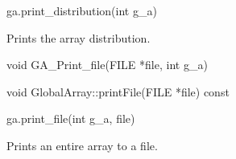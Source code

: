 \documentclass[12pt]{article}
\begin{document}
\begin{pyapi}
\begin{pycode}
ga.print_distribution(int g_a)
\end{pycode}
\begin{funcargs}
\end{funcargs}
\end{pyapi}

\gcoll

\begin{desc}

Prints the array distribution.

\end{desc}


\begin{capi}
\begin{ccode}
void GA_Print_file(FILE *file, int g_a)
\end{ccode}
\begin{funcargs}
\end{funcargs}
\end{capi}

\begin{cxxapi}
\begin{cxxcode}
void GlobalArray::printFile(FILE *file) const
\end{cxxcode}
\begin{funcargs}
\end{funcargs}
\end{cxxapi}

\begin{pyapi}
\begin{pycode}
ga.print_file(int g_a, file)
\end{pycode}
\begin{funcargs}
\end{funcargs}
\end{pyapi}

\gcoll

\begin{desc}

Prints an entire array to a file.

\end{desc}

\end{document}
